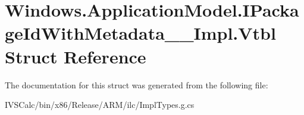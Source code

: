 \hypertarget{struct_windows_1_1_application_model_1_1_i_package_id_with_metadata_____impl_1_1_vtbl}{}\section{Windows.\+Application\+Model.\+I\+Package\+Id\+With\+Metadata\+\_\+\+\_\+\+Impl.\+Vtbl Struct Reference}
\label{struct_windows_1_1_application_model_1_1_i_package_id_with_metadata_____impl_1_1_vtbl}


The documentation for this struct was generated from the following file\+:\begin{DoxyCompactItemize}
\item 
I\+V\+S\+Calc/bin/x86/\+Release/\+A\+R\+M/ilc/Impl\+Types.\+g.\+cs\end{DoxyCompactItemize}
